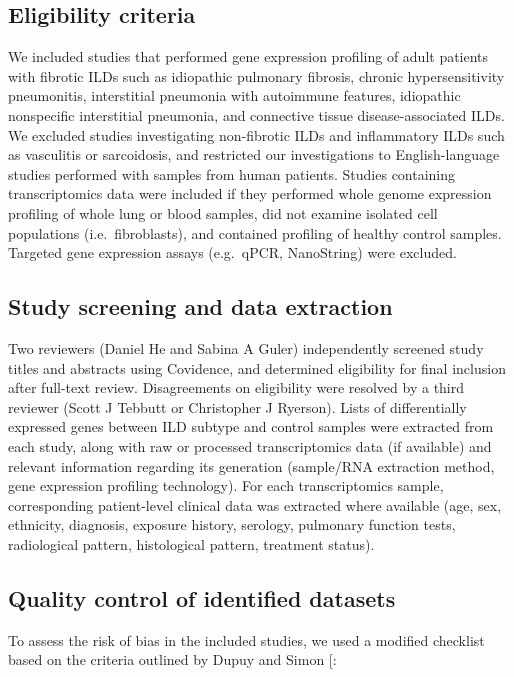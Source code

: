 \documentclass[
]{article}
\begin{document}
\subsection{Eligibility criteria}\label{eligibility-criteria}

We included studies that performed gene expression profiling of adult patients with fibrotic ILDs such as idiopathic pulmonary fibrosis, chronic hypersensitivity pneumonitis, interstitial pneumonia with autoimmune features, idiopathic nonspecific interstitial pneumonia, and connective tissue disease-associated ILDs. We excluded studies investigating non-fibrotic ILDs and inflammatory ILDs such as vasculitis or sarcoidosis, and restricted our investigations to English-language studies performed with samples from human patients. Studies containing transcriptomics data were included if they performed whole genome expression profiling of whole lung or blood samples, did not examine isolated cell populations (i.e.~fibroblasts), and contained profiling of healthy control samples. Targeted gene expression assays (e.g.~qPCR, NanoString) were excluded.

\subsection{Study screening and data extraction}\label{study-screening-and-data-extraction}

Two reviewers (Daniel He and Sabina A Guler) independently screened study titles and abstracts using Covidence, and determined eligibility for final inclusion after full-text review. Disagreements on eligibility were resolved by a third reviewer (Scott J Tebbutt or Christopher J Ryerson). Lists of differentially expressed genes between ILD subtype and control samples were extracted from each study, along with raw or processed transcriptomics data (if available) and relevant information regarding its generation (sample/RNA extraction method, gene expression profiling technology). For each transcriptomics sample, corresponding patient-level clinical data was extracted where available (age, sex, ethnicity, diagnosis, exposure history, serology, pulmonary function tests, radiological pattern, histological pattern, treatment status).

\subsection{Quality control of identified datasets}\label{qc}

To assess the risk of bias in the included studies, we used a modified checklist based on the criteria outlined by Dupuy and Simon {[}\citeproc{ref-dupuy_critical_2007}{40}{]}:
\end{document}
